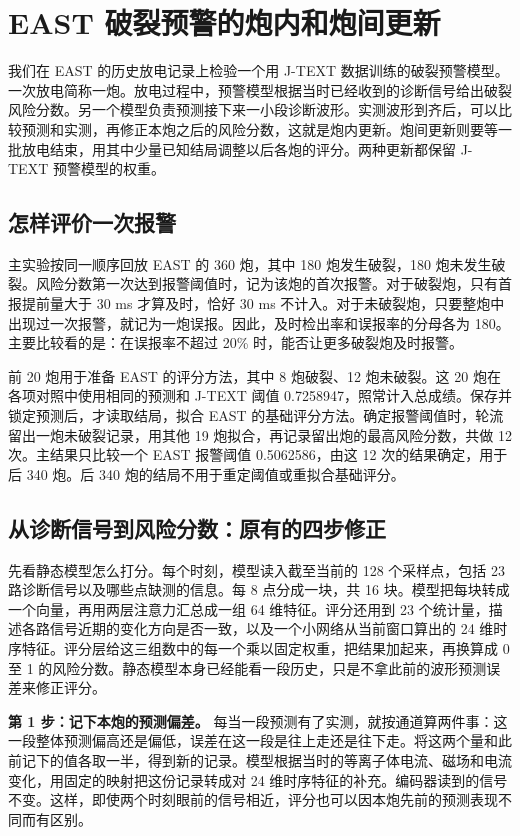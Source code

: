\section{EAST 破裂预警的炮内和炮间更新}
\label{sec:east360-online-adaptation}

我们在 EAST 的历史放电记录上检验一个用 J-TEXT 数据训练的破裂预警模型。一次放电简称一炮。放电过程中，预警模型根据当时已经收到的诊断信号给出破裂风险分数。另一个模型负责预测接下来一小段诊断波形。实测波形到齐后，可以比较预测和实测，再修正本炮之后的风险分数，这就是炮内更新。炮间更新则要等一批放电结束，用其中少量已知结局调整以后各炮的评分。两种更新都保留 J-TEXT 预警模型的权重。

\subsection{怎样评价一次报警}

主实验按同一顺序回放 EAST 的 360 炮，其中 180 炮发生破裂，180 炮未发生破裂。风险分数第一次达到报警阈值时，记为该炮的首次报警。对于破裂炮，只有首报提前量大于 30 ms 才算及时，恰好 30 ms 不计入。对于未破裂炮，只要整炮中出现过一次报警，就记为一炮误报。因此，及时检出率和误报率的分母各为 180。主要比较看的是：在误报率不超过 20\% 时，能否让更多破裂炮及时报警。

前 20 炮用于准备 EAST 的评分方法，其中 8 炮破裂、12 炮未破裂。这 20 炮在各项对照中使用相同的预测和 J-TEXT 阈值 0.7258947，照常计入总成绩。保存并锁定预测后，才读取结局，拟合 EAST 的基础评分方法。确定报警阈值时，轮流留出一炮未破裂记录，用其他 19 炮拟合，再记录留出炮的最高风险分数，共做 12 次。主结果只比较一个 EAST 报警阈值 0.5062586，由这 12 次的结果确定，用于后 340 炮。后 340 炮的结局不用于重定阈值或重拟合基础评分。

\subsection{从诊断信号到风险分数：原有的四步修正}

先看静态模型怎么打分。每个时刻，模型读入截至当前的 128 个采样点，包括 23 路诊断信号以及哪些点缺测的信息。每 8 点分成一块，共 16 块。模型把每块转成一个向量，再用两层注意力汇总成一组 64 维特征。评分还用到 23 个统计量，描述各路信号近期的变化方向是否一致，以及一个小网络从当前窗口算出的 24 维时序特征。评分层给这三组数中的每一个乘以固定权重，把结果加起来，再换算成 0 至 1 的风险分数。静态模型本身已经能看一段历史，只是不拿此前的波形预测误差来修正评分。

\textbf{第 1 步：记下本炮的预测偏差。} 每当一段预测有了实测，就按通道算两件事：这一段整体预测偏高还是偏低，误差在这一段是往上走还是往下走。将这两个量和此前记下的值各取一半，得到新的记录。模型根据当时的等离子体电流、磁场和电流变化，用固定的映射把这份记录转成对 24 维时序特征的补充。编码器读到的信号不变。这样，即使两个时刻眼前的信号相近，评分也可以因本炮先前的预测表现不同而有区别。

